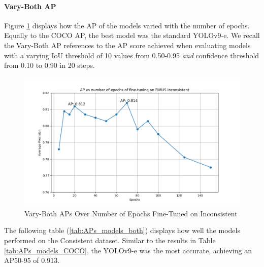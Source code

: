 \paragraph{Vary-Both AP}
Figure \ref{fig:plot_AP_both} displays how the AP of the models varied with the number of epochs. Equally to the COCO AP, the best model was the standard YOLOv9-e. We recall the Vary-Both AP references to the AP score achieved when evaluating models with a varying IoU threshold of 10 values from 0.50-0.95 \textit{and} confidence threshold from 0.10 to 0.90 in 20 steps.

\begin{figure}[H]
    \centering
    \includegraphics[width=.8\textwidth]{Images/Analytics/plot_AP_both.png}
    \caption{Vary-Both APs Over Number of Epochs Fine-Tuned on Inconsistent}
    \label{fig:plot_AP_both}
\end{figure}

The following table (\ref{tab:APs_models_both}) displays how well the models performed on the Consistent dataset. Similar to the results in Table \ref{tab:APs_models_COCO}, the YOLOv9-e was the most accurate, achieving an AP50-95 of 0.913.

